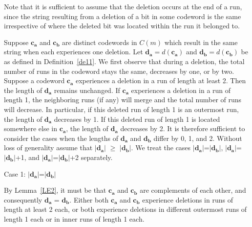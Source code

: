 Note that it is sufficient to assume that the deletion occurs at
the end of a run, since the string resulting from a deletion of a
bit in some codeword is the same irrespective of where the deleted
bit was located within the run it belonged to.

Suppose $\mathbf{c_a}$ and $\mathbf{c_b}$ are distinct codewords
in $C(m)$ which result in the same string when each experiences
one deletion. Let $\mathbf{d_a}=d(\mathbf{c_a})$ and
$\mathbf{d_b}=d(\mathbf{c_b})$ be as defined in
Definition~\ref{de11}. We first observe that during a deletion,
the total number of runs in the codeword stays the same, decreases
by one, or by two. Suppose a codeword $\mathbf{c_a}$ experiences a
deletion in a run of length at least 2. Then the length of
$\mathbf{d_a}$ remains unchanged. If $\mathbf{c_a}$ experiences a
deletion in a run of length 1, the neighboring runs (if any) will
merge and the total number of runs will decrease. In particular,
if this deleted run of length 1 is an outermost run, the length of
$\mathbf{d_a}$ decreases by 1.  If this deleted run of length 1 is
located somewhere else in $\mathbf{c_a}$, the length of
$\mathbf{d_a}$ decreases by 2. It is therefore sufficient to
consider the cases when the lengths of $\mathbf{d_a}$ and
$\mathbf{d_b}$ differ by 0, 1, and 2. Without loss of generality
assume that $|\mathbf{d_a}|$ $\geq$ $|\mathbf{d_b}|$. We treat the
cases $|\mathbf{d_a}|$=$|\mathbf{d_b}|$,
$|\mathbf{d_a}|$=$|\mathbf{d_b}|$+1, and
$|\mathbf{d_a}|$=$|\mathbf{d_b}|$+2 separately.

Case 1: $|\mathbf{d_a}|$=$|\mathbf{d_b}|$

By Lemma~\ref{LE2}, it must be that $\mathbf{c_a}$ and
$\mathbf{c_b}$ are complements of each other, and consequently
$\mathbf{d_a}$ = $\mathbf{d_b}$. Either both $\mathbf{c_a}$ and
$\mathbf{c_b}$ experience deletions in runs of length at least 2
each, or both experience deletions in different outermost runs of
length 1 each or in inner runs of length 1 each.

